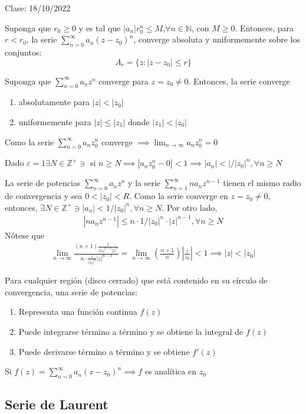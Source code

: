 Clase: 18/10/2022


\begin{lema}
    Suponga que $r_0\geq 0$ y es tal que $|a_n|r_0^n\leq M$,$\forall n\in \mathbb{N}$, con $M\geq 0$. Entonces, para $r<r_0$, la serie $\sum_{n=0}^\infty a_n(z-z_0)^n$, converge absoluta y uniformemente sobre los conjuntos:
    $$A_r=\{z:|z-z_0|\leq r\}$$
\end{lema}

\begin{teorema}
    Suponga que $\sum_{n=0}^\infty a_nz^n$ converge para $z=z_0\neq 0$. Entonces, la serie converge
    \begin{enumerate}
        \item absolutamente para $|z|<|z_0|$
        \item uniformemente para $|z|\leq |z_1|$ donde $|z_1|<|z_0|$
    \end{enumerate}
    \begin{dem}
        Como la serie $\sum_{n=0}^\infty a_nz_0^n$ converge $\implies \lim_{n\to\infty}a_nz_0^n=0$
        \begin{dem}
            Dado $\varepsilon=1\exists N\in \mathbb{Z}^+\ni$ si $n\geq N\implies |a_nz_0^n -0|<1\implies |a_n|<|/|z_0|^n,\forall n\geq N$
        \end{dem}
    \end{dem}
\end{teorema}

\begin{prop}
    La serie de potencias $\sum_{n=0}^\infty a_nz^n$ y la serie $\sum_{n=1}^{\infty}na_nz^{n-1}$ tienen el mismo radio de convergencia y sea $0<|z_0|<R$. Como la serie converge en $z=z_0\neq 0$, entonces, $\exists N\in \mathbb{Z}^+\ni |a_n|<1/|z_0|^n,\forall n\geq N$. Por otro lado, 
    \begin{align*}
        |na_nz^{n-1}|\leq n\cdot 1/|z_0|^n \cdot |z|^{n-1},\forall n\geq N
    \end{align*}
    Nótese que 
    \begin{align*}
        \lim_{n\to\infty}\frac{(n+1)\frac{1}{|z_0|^{n+1}|z|^n}}{n\cdot \frac{1}{|z_0|^n}|z|^{n-1}} = \lim_{n\to\infty}\left(\frac{n+1}{n}\right)\left|\frac{z}{z_0}\right| <1\implies |z|<|z_0|
    \end{align*}
\end{prop}

\begin{teorema}
    Para cualquier región (disco cerrado) que está contenido en su círculo de convergencia, una serie de potencias: 
    \begin{enumerate}
        \item Representa una función continua $f(z)$
        \item Puede integrarse término a término y se obtiene la integral de $f(z)$
        \item Puede derivarse término a término y se obtiene $f'(z)$
    \end{enumerate}
    \begin{cajita}
        Si $f(z)=\sum_{n=0}^\infty a_n(z-z_0)^n\implies f$ es analítica en $z_0$
    \end{cajita}
\end{teorema}


\subsection{Serie de Laurent}

